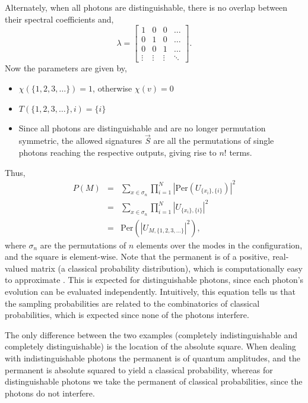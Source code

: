 \documentclass[aps,pra,twocolumn,amsmath,amssymb,nofootinbib,superscriptaddress]{revtex4}
\begin{document}
Alternately, when all photons are distinguishable, there is no overlap between their spectral coefficients and,
\begin{equation}
\lambda =
\left[ \begin{array}{cccc}
1 & 0 & 0 & \ldots \\
0 & 1 & 0 & \ldots \\
0 & 0 & 1 & \ldots \\
\vdots & \vdots & \vdots & \ddots
\end{array} \right].
\end{equation}
Now the parameters are given by,
\begin{itemize}
\item \mbox{$\chi(\{1,2,3,\dots\})=1$}, otherwise \mbox{$\chi(v)=0$}
\item \mbox{$T(\{1,2,3,\dots\},i)=\{i\}$}
\item Since all photons are distinguishable and are no longer permutation symmetric, the allowed signatures $\vec{S}$ are all the permutations of single photons reaching the respective outputs, giving rise to $n!$ terms.
\end{itemize}
Thus,
\begin{eqnarray}
P(M) &=& \sum_{x\in \sigma_n} \prod_{i=1}^N \left|\mathrm{Per}\left(U_{\{x_i\},\{i\}}\right)\right|^2 \\ \nonumber
&=& \sum_{x\in \sigma_n} \prod_{i=1}^N \left|U_{\{x_i\},\{i\}}\right|^2 \\ \nonumber
&=& \mathrm{Per}\left(\left|U_{M,\{1,2,3,\dots\}}\right|^2\right),
\end{eqnarray}
where $\sigma_n$ are the permutations of $n$ elements over the modes in the configuration, and the square is element-wise. Note that the permanent is of a positive, real-valued matrix (a classical probability distribution), which is computationally easy to approximate \cite{bib:SinclairPerm}. This is expected for distinguishable photons, since each photon's evolution can be evaluated independently. Intuitively, this equation tells us that the sampling probabilities are related to the combinatorics of classical probabilities, which is expected since none of the photons interfere.

The only difference between the two examples (completely indistinguishable and completely distinguishable) is the location of the absolute square. When dealing with indistinguishable photons the permanent is of quantum amplitudes, and the permanent is absolute squared to yield a classical probability, whereas for distinguishable photons we take the permanent of classical probabilities, since the photons do not interfere.
\end{document}
